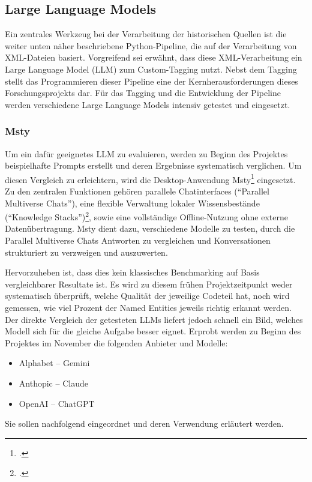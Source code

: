 \documentclass[12pt, a4paper, ngerman, bidi=default]{article}
\let\cite\footcite
\begin{document}
\subsection{Large Language Models} \label{subsubsec:LLM_use}
Ein zentrales Werkzeug bei der Verarbeitung der historischen Quellen ist die weiter unten näher beschriebene Python-Pipeline, die auf der Verarbeitung von XML-Dateien basiert. Vorgreifend sei erwähnt, dass diese XML-Verarbeitung ein Large Language Model (LLM) zum Custom-Tagging nutzt. Nebst dem Tagging stellt das Programmieren dieser Pipeline eine der Kernherausforderungen dieses Forschungsprojekts dar. 
Für das Tagging und die Entwicklung der Pipeline werden verschiedene Large Language Models intensiv getestet und eingesetzt.
\subsubsection{Msty}
Um ein dafür geeignetes LLM zu evaluieren, werden zu Beginn des Projektes beispielhafte Prompts erstellt und deren Ergebnisse systematisch verglichen. Um diesen Vergleich zu erleichtern, wird die Desktop-Anwendung Msty\cite[vgl.][]{noauthor_msty_nodate} eingesetzt. Zu den zentralen Funktionen gehören parallele Chatinterfaces (\enquote{Parallel Multiverse Chats}),
eine flexible Verwaltung lokaler Wissensbestände (\enquote{Knowledge Stacks})\cite[vgl.][]{noauthor_msty_nodate}, sowie eine vollständige Offline-Nutzung ohne externe Datenübertragung. Msty dient dazu, verschiedene Modelle zu testen, durch die Parallel Multiverse Chats Antworten zu vergleichen und Konversationen strukturiert zu verzweigen und auszuwerten.

Hervorzuheben ist, dass dies kein klassisches Benchmarking auf Basis vergleichbarer Resultate ist. Es wird zu diesem frühen Projektzeitpunkt weder systematisch überprüft, welche Qualität der jeweilige Codeteil hat, noch wird gemessen, wie viel Prozent der Named Entities jeweils richtig erkannt werden. Der direkte Vergleich der getesteten LLMs liefert jedoch schnell ein Bild, welches Modell sich für die gleiche Aufgabe besser eignet. Erprobt werden zu Beginn des Projektes im November die folgenden Anbieter und Modelle:
\begin{itemize}
    \item Alphabet – Gemini
    \item Anthopic – Claude
    \item OpenAI – ChatGPT
\end{itemize}
Sie sollen nachfolgend eingeordnet und deren Verwendung erläutert werden.
\end{document}
